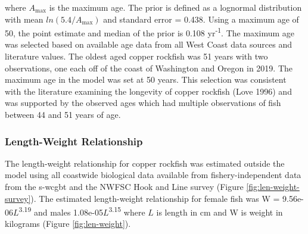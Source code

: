 \documentclass[11pt,
  english,
  a4paper,
]{article}
\begin{document}

where {\(A_{\text{max}}\)\leavevmode\tagmcend\tagstructend} is the maximum age. The prior is defined as a lognormal distribution with mean {\(ln(5.4/A_{\text{max}})\)\leavevmode\tagmcend\tagstructend} and standard error = 0.438. Using a maximum age of 50, the point estimate and median of the prior is 0.108 yr\textsuperscript{-1}. The maximum age was selected based on available age data from all West Coast data sources and literature values. The oldest aged copper rockfish was 51 years with two observations, one each off of the coast of Washington and Oregon in 2019. The maximum age in the model was set at 50 years. This selection was consistent with the literature examining the longevity of copper rockfish {(Love 1996)\leavevmode\tagmcend\tagstructend} and was supported by the observed ages which had multiple observations of fish between 44 and 51 years of age.

\leavevmode\tagmcend\tagstructend\par


\hypertarget{length-weight-relationship}{%
\subsubsection{Length-Weight Relationship}\label{length-weight-relationship}}

\leavevmode\tagmcend\tagstructend


The length-weight relationship for copper rockfish was estimated outside the model using all coastwide biological data available from fishery-independent data from the \gls{s-wcgbt} and the NWFSC Hook and Line survey (Figure \ref{fig:len-weight-survey}). The estimated length-weight relationship for female fish was W = 9.56e-06{\(L\)\leavevmode\tagmcend\tagstructend}\textsuperscript{3.19} and males 1.08e-05{\(L\)\leavevmode\tagmcend\tagstructend}\textsuperscript{3.15} where {\(L\)\leavevmode\tagmcend\tagstructend} is length in cm and W is weight in kilograms (Figure \ref{fig:len-weight}).
\end{document}
